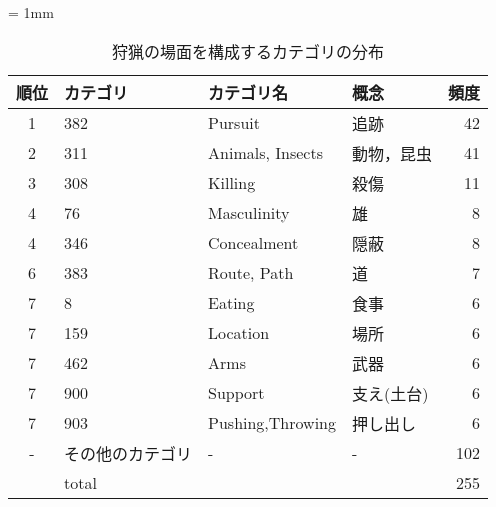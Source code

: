\small
\begin{table}[p]
  \caption{狩猟の場面を構成するカテゴリの分布}
  \label{hunt_distri}
  \begin{center}
    \tabcolsep = 1mm
    \begin{tabular}{|c|l|l|l|r|} \hline
順位    & カテゴリ  & カテゴリ名 & 概念 & 頻度 \\ 
      \hline \hline
      1 & 382       & Pursuit          & 追跡       & 42 \\
      2 & 311       & Animals, Insects & 動物，昆虫 & 41 \\
      3 & 308       & Killing          & 殺傷       & 11 \\
      4 & 76        & Masculinity      & 雄         & 8  \\
      4 & 346       & Concealment      & 隠蔽       & 8  \\
      6 & 383       & Route, Path      & 道         & 7  \\
      7 & 8         & Eating           & 食事       & 6  \\
      7 & 159       & Location         & 場所       & 6  \\
      7 & 462       & Arms             & 武器       & 6  \\
      7 & 900       & Support          & 支え(土台) & 6  \\
      7 & 903       & Pushing,Throwing & 押し出し   & 6  \\
      - & その他のカテゴリ    & -                & -          & 102 \\ \hline
        & total     &                  &            & 255\\
      \hline
    \end{tabular}
  \end{center}
\end{table}
\normalsize

